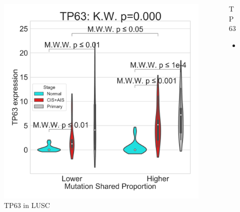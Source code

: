 \documentclass{beamer}
\begin{document}
\begin{frame}[allowframebreaks]
                    \begin{columns}
                        \begin{column}{0.4 \textwidth}
                            \begin{figure}
                                \includegraphics[width=\linewidth]{figures/DEG/Violin/STAR.TPM.SQC.MSP-Median.violin/Mutation Shared Proportion_TP63.pdf}
                                \caption{TP63 in LUSC}
                            \end{figure}
                        \end{column}
                        \begin{column}{0.55 \textwidth}
                            \begin{block}{TP63}
                                \begin{itemize}
                                    \item
                                \end{itemize}
                            \end{block}
                        \end{column}
                    \end{columns}
                \end{frame}
\end{document}
